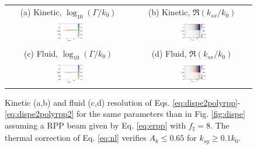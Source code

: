 \documentclass[
 reprint,
 superscriptaddress,
 amsmath,amssymb,
 aps,
]{revtex4-1}
\begin{document}
 \begin{figure}
\begin{tabular}{cc}
(a) Kinetic, $\log_{10}(\Gamma/k_0)$ &
(b)  Kinetic, $\Re(k_{sx}/k_0)$ \\
\includegraphics[width=0.24\textwidth]{gkH300.png}&
\includegraphics[width=0.24\textwidth]{kkH300.png}\\
(c) Fluid, $\log_{10}(\Gamma/k_0)$  &
(d) Fluid, $\Re(k_{sx}/k_0)$  \\
\includegraphics[width=0.24\textwidth]{gfH300.png}&
\includegraphics[width=0.24\textwidth]{kfH300.png}
\end{tabular}
\caption{ \label{fig:disperpp}  
Kinetic (a,b) and fluid (c,d) resolution of Eqs. \eqref{eq:dispe2polyrpp}-\eqref{eq:dispe2polyrpp2} for  the same parameters than in Fig. \ref{fig:dispe} assuming a RPP beam given by Eq. \eqref{eq:erpp} with $f_\sharp=8$. The thermal correction of Eq. \eqref{eq:nl} verifies $A_k\le 0.65$ for $k_{sy}\ge 0.1k_0$.
 }
\end{figure}
\end{document}
